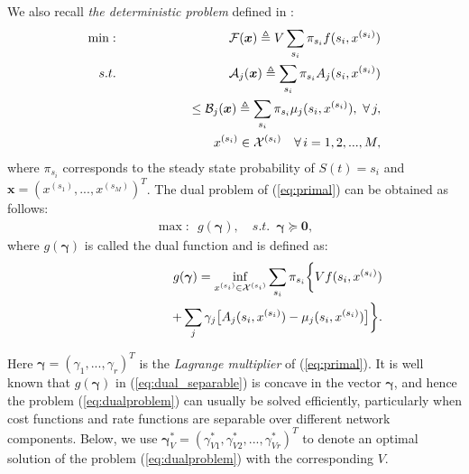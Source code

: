 \documentclass[journal]{IEEEtran}
\newcommand{\bv}[1]{{\boldsymbol{#1} }}
\newcommand{\script}[1]{{{\cal{#1} }}}
\begin{document}
We also recall  \emph{the deterministic problem} defined in \cite{huangneely_dr_tac}:
\begin{eqnarray}
\min:&&\script{F}(\bv{x})\triangleq V\sum_{s_i}\pi_{s_i}f(s_i, x^{(s_i)})\label{eq:primal}\\
s.t.&&\script{A}_j(\bv{x})\triangleq\sum_{s_i}\pi_{s_i}A_j(s_i, x^{(s_i)})\nonumber\\
&&\qquad\qquad\quad\leq \script{B}_j(\bv{x})\triangleq\sum_{s_i}\pi_{s_i}\mu_j(s_i, x^{(s_i)}),\,\,\forall\, j,\nonumber\\
&& x^{(s_i)}\in \script{X}^{(s_i)}\quad \forall\, i=1, 2, ..., M,\nonumber
\end{eqnarray}
where $\pi_{s_i}$ corresponds to the steady state probability of $S(t)=s_i$ and $\bv{x}=(x^{(s_1)}, ..., x^{(s_M)})^T$. The dual problem of (\ref{eq:primal}) can be obtained as follows:
\begin{eqnarray}
\max:\,\,\, g(\bv{\gamma}),\quad s.t.\,\,\, \bv{\gamma}\succeq\bv{0},\label{eq:dualproblem}
\end{eqnarray}
where $g(\bv{\gamma})$ is called the dual function and is defined as:
\begin{eqnarray}
\hspace{-.3in}&&g(\bv{\gamma})=\inf_{x^{(s_i)}\in \script{X}^{(s_i)}}\sum_{s_i}\pi_{s_i}\bigg\{Vf(s_i, x^{(s_i)})\label{eq:dual_separable}\\
\hspace{-.3in}&&\qquad\qquad\qquad\qquad+\sum_j\gamma_j\big[A_j(s_i, x^{(s_i)})- \mu_j(s_i, x^{(s_i)})\big]\bigg\}.\nonumber
\end{eqnarray}

Here $\bv{\gamma}=(\gamma_1, ..., \gamma_r)^T$ is the \emph{Lagrange multiplier} of (\ref{eq:primal}). It is well known that $g(\bv{\gamma})$ in (\ref{eq:dual_separable}) is concave in the vector $\bv{\gamma}$, and hence the problem (\ref{eq:dualproblem}) can usually be solved efficiently, particularly when cost functions and rate functions are separable over different network components. Below, we use $\bv{\gamma}_V^*=(\gamma^*_{V1}, \gamma^*_{V2}, ..., \gamma^*_{Vr})^T$ to denote an optimal solution of the problem (\ref{eq:dualproblem}) with the corresponding $V$. 




\vspace{-.1in}
\end{document}
